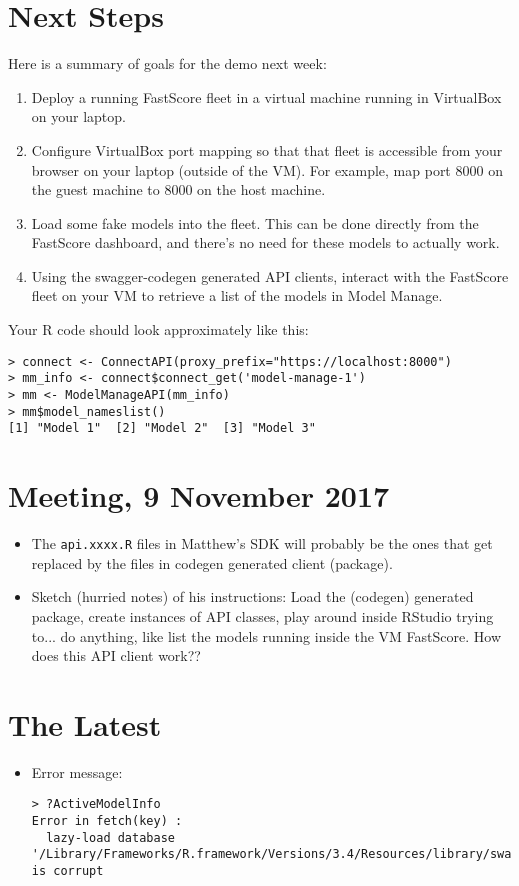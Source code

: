 \documentclass{article}
\begin{document}
\section*{Next Steps}
Here is a summary of goals for the demo next week:
\begin{enumerate}
\item Deploy a running FastScore fleet in a virtual machine running in VirtualBox on your laptop.
\item Configure VirtualBox port mapping so that that fleet is accessible from your browser on your laptop (outside of the VM). For example, map port 8000 on the guest machine to 8000 on the host machine.
\item Load some fake models into the fleet. This can be done directly from the FastScore dashboard, and there's no need for these models to actually work.
\item Using the swagger-codegen generated API clients, interact with the FastScore fleet on your VM to retrieve a list of the models in Model Manage.
\end{enumerate}

Your R code should look approximately like this:
\begin{verbatim}
> connect <- ConnectAPI(proxy_prefix="https://localhost:8000")
> mm_info <- connect$connect_get('model-manage-1')
> mm <- ModelManageAPI(mm_info)
> mm$model_nameslist()
[1] "Model 1"  [2] "Model 2"  [3] "Model 3"
\end{verbatim}

\section*{Meeting, 9 November 2017}
\begin{itemize}
\item The \verb|api.xxxx.R| files in Matthew's SDK will probably be the ones that get replaced by the files in codegen generated client (package).
\item Sketch (hurried notes) of his instructions: Load the (codegen) generated package, create instances of API classes, play around inside RStudio trying to... do anything, like list the models running inside the VM FastScore. How does this API client work??
\end{itemize}

\section*{The Latest}
\begin{itemize}
\item Error message:
\begin{verbatim}
> ?ActiveModelInfo
Error in fetch(key) : 
  lazy-load database '/Library/Frameworks/R.framework/Versions/3.4/Resources/library/swagger/help/swagger.rdb' is corrupt
\end{verbatim}
\end{itemize}
\end{document}
